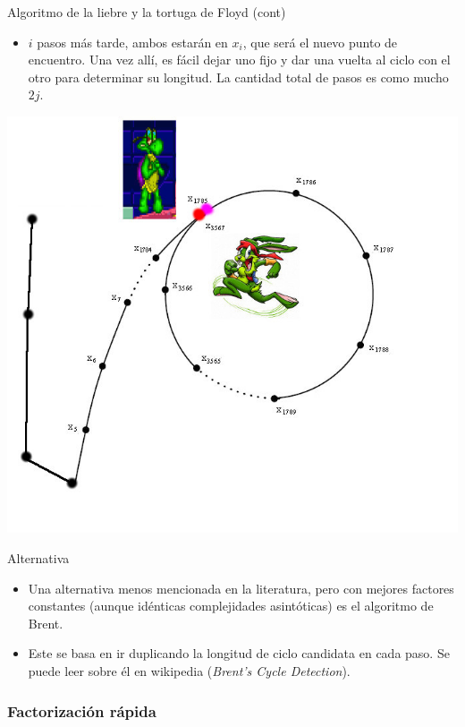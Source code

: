 \documentclass{beamer}
\begin{document}
\begin{frame}{Algoritmo de la liebre y la tortuga de Floyd (cont)}
    \begin{itemize}
    \item $i$ pasos más tarde, ambos estarán en $x_i$, que será el nuevo punto de encuentro. Una vez allí, es fácil dejar uno fijo y dar una vuelta al ciclo con el otro para determinar su longitud. La cantidad total de pasos es como mucho $2j$.
    \end{itemize}
    {\hfill \includegraphics[scale=0.35]{hare_tortoise_rho_cycle4.jpg} \hfill}
\end{frame}

\begin{frame}{Alternativa}
    \begin{itemize}
    \item Una alternativa menos mencionada en la literatura, pero con mejores factores constantes (aunque idénticas complejidades asintóticas) es el algoritmo de Brent.
    \item Este se basa en ir duplicando la longitud de ciclo candidata en cada paso. Se puede leer sobre él en wikipedia (\textit{Brent's Cycle Detection}).
    \end{itemize}
\end{frame}

\subsubsection{Factorización rápida}
\end{document}
